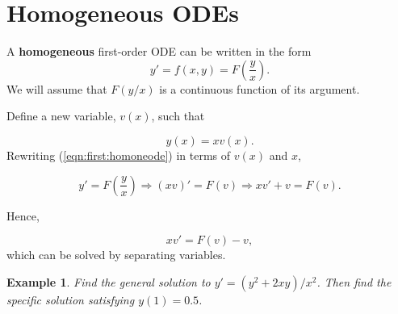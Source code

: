 \documentclass[a4paper]{report}
\newtheorem{example}{Example}[chapter]
\begin{document}
\section{Homogeneous ODEs}
\label{sec:first:hom}

A {\bf homogeneous} first-order ODE can be written in the form
\begin{equation}
y'=f(x,y)=F\left(\frac{y}{x} \right).
\label{eqn:first:homoneode}
\end{equation}
\noindent We will assume that $F(y/x)$ is a continuous function of its argument. \\

\par {} Define a new variable, $v(x)$, such that 

\begin{equation}
\label{eqn:first:homoneodeidea}
y(x)=xv(x).
\end{equation}
\noindent Rewriting (\ref{eqn:first:homoneode}) in terms of $v(x)$ and $x$, 

\begin{displaymath}
y'=F\left(\frac{y}{x}\right) \Longrightarrow \left(xv\right)'=F(v) \Longrightarrow xv' + v = F(v).
\end{displaymath}

\noindent Hence,

\begin{equation}
\label{eqn:first:homoneodesolution}
xv' = F(v) - v,
\end{equation}
\noindent which can be solved by separating variables.

\begin{example}
\label{ex:first:hom}
Find the general solution to $y'=(y^2+2xy)/x^2$. Then find the specific solution satisfying $y(1)=0.5$.
\end{example}
\end{document}
